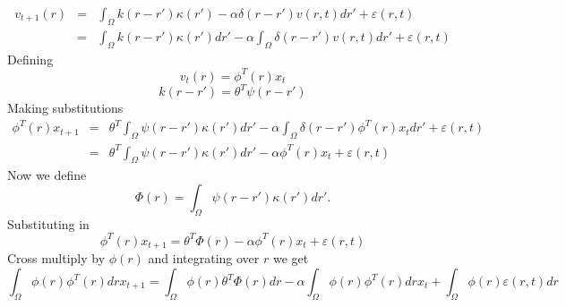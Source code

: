 \documentclass[onecolumn,draftcls]{IEEEtran}
\begin{document}
\begin{eqnarray}
  {v_{t + 1}}\left( r \right)  &=& \int_\Omega  {k\left( {r - r'} \right)\kappa \left( r' \right) - \alpha \delta \left( {r - r'} \right)v\left( {r,t} \right)dr'}  + \varepsilon\left( {r,t} \right) \\
   &=& \int_\Omega  {k\left( {r - r'} \right)\kappa \left( r' \right)dr'}  - \alpha\int_\Omega  { \delta \left( {r - r'} \right)v\left( {r,t} \right)dr'}  + \varepsilon\left( {r,t} \right)
\end{eqnarray}
Defining
\begin{equation}\label{FieldDecomp}
{v_t}\left( r \right) = {\phi ^T}\left( r \right){x_t}
\end{equation}
\begin{equation}\label{KernelDecomp}
k\left( {r - r'} \right) = {\theta ^T}\psi \left( {r - r'} \right)
\end{equation}
Making substitutions
\begin{eqnarray}
  {\phi ^T}\left( r \right){x_{t+1}}  &=& {\theta ^T}\int_\Omega  {\psi \left( {r - r'} \right)\kappa \left( r' \right)dr'}  - \alpha \int_\Omega  {\delta \left( {r - r'} \right){\phi ^T}\left( r \right){x_t}dr'}  + \varepsilon \left( {r,t} \right) \\
   &=& {\theta ^T}\int_\Omega  {\psi \left( {r - r'} \right)\kappa \left( r' \right)dr'}  - \alpha {\phi ^T}\left( r \right){x_t} + \varepsilon \left( {r,t} \right)
\end{eqnarray}
Now we define
\begin{equation}\label{DefFiringConnectivity}
\Phi \left( r \right) = \int_\Omega  {\psi \left( {r - r'} \right)\kappa \left( r' \right)dr'}.
\end{equation}
Substituting in
\begin{equation}\label{Dunno}
{\phi ^T}\left( r \right){x_{t+1}} = {\theta ^T}\Phi \left( r \right) - \alpha {\phi ^T}\left( r \right){x_t} + \varepsilon \left( {r,t} \right)
\end{equation}
Cross multiply by $\phi(r)$ and integrating over $r$ we get
\begin{equation}\label{TooTired}
\int_\Omega  {\phi \left( r \right){\phi ^T}\left( r \right)dr} {x_{t+1}} = \int_\Omega  {\phi \left( r \right){\theta ^T}\Phi \left( r \right)dr}  - \alpha \int_\Omega  {\phi \left( r \right){\phi ^T}\left( r \right)dr} {x_t} + \int_\Omega  {\phi \left( r \right)\varepsilon \left( {r,t} \right)dr}
\end{equation}
\end{document}
